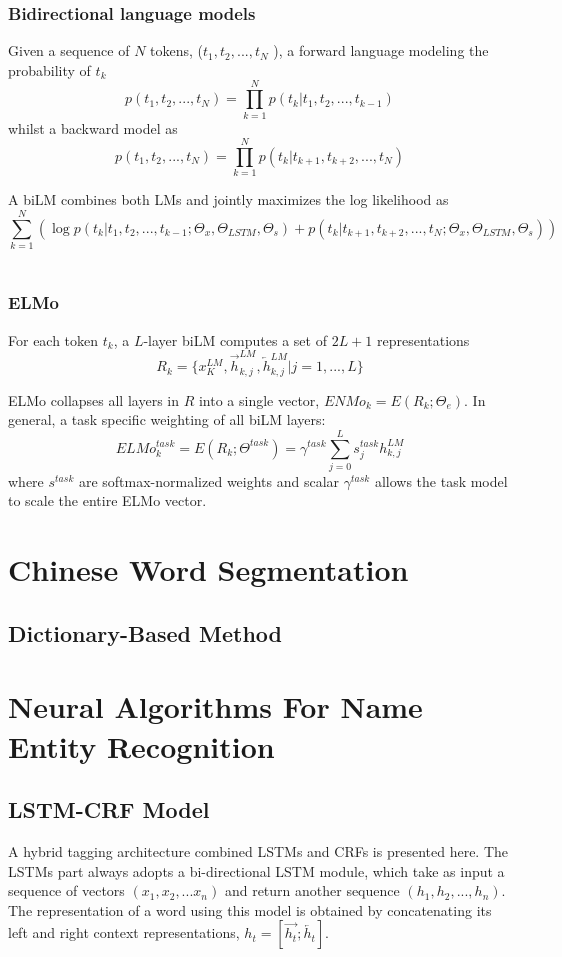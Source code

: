 \documentclass[a3paper, 12pt]{book} %
\begin{document}
\subsection{Bidirectional language models}

Given a sequence of $N$ tokens, ($t_1, t_2 , ..., t_N$ ), a forward language modeling the probability of $t_k$
$$p(t_1,t_2,...,t_N)=\prod_{k=1}^{N}{p(t_k|t_1,t_2,...,t_{k-1})}$$
whilst a backward model as 
$$p(t_1,t_2,...,t_N)=\prod_{k=1}^{N}{p(t_k|t_{k+1},t_{k+2},...,t_{N})}$$

A biLM combines both LMs and jointly maximizes the log likelihood as 
$$\sum_{k=1}^{N}{(\log{p(t_k|t_1,t_2,...,t_{k-1};\Theta_x,\Theta_{LSTM},\Theta_{s}) + p(t_k|t_{k+1},t_{k+2},...,t_{N};\Theta_x, \Theta_{LSTM},\Theta_s)})}$$ \\


\subsection{ELMo}

For each token $t_k$, a $L$-layer biLM computes a set of $2L+1$ representations
$$R_k = \{x_K^{LM}, \overrightarrow{h}_{k,j}^{LM}, \overleftarrow{h}_{k,j}^{LM} |j=1,...,L\}$$

ELMo collapses all layers in $R$ into a single vector, $ENMo_k=E(R_k;\Theta_{e})$.
In general, a task specific weighting of all biLM layers: 
$$ELMo_{k}^{task}=E(R_k;\Theta^{task})=\gamma^{task}\sum_{j=0}^{L}{s_j^{task}h_{k,j}^{LM}}$$
where $s^{task}$ are softmax-normalized weights and scalar $\gamma^{task}$ allows the task model to scale the entire ELMo vector.

\chapter{Chinese Word Segmentation}
\section{Dictionary-Based Method}

\chapter{Neural Algorithms For Name Entity Recognition}
\section{LSTM-CRF Model}
A hybrid tagging architecture combined LSTMs and CRFs is presented here. The LSTMs part always adopts a bi-directional LSTM module, which take as input a sequence of vectors $(x_1, x_2,...x_n)$ and return another sequence $(h_1,h_2,...,h_n)$. The representation of a word using this model is obtained by concatenating its left and right context representations, $h_t=[\overrightarrow{h_t};\overleftarrow{h_t}]$.
\end{document}
